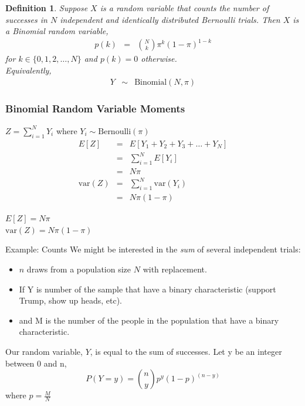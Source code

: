 \documentclass[handout]{beamer}
\newtheorem{defn}{Definition}
\numberwithin{equation}{section}
\begin{document}
\begin{frame}
\begin{defn}
Suppose $X$ is a random variable that counts the number of successes in $N$ independent and identically distributed Bernoulli trials.  Then $X$ is a \alert{Binomial} random variable, 
\begin{eqnarray}
p(k) & = & {{N}\choose{k}}\pi^{k} (1- \pi)^{1-k} \nonumber 
\end{eqnarray}
for $k \in \{0, 1, 2, \hdots, N\}$ and $p(k) = 0$ otherwise.  \\
Equivalently, 
\begin{eqnarray}
Y & \sim & \text{Binomial}(N, \pi) \nonumber 
\end{eqnarray}

\end{defn}

\end{frame}


\begin{frame}
\frametitle{Binomial Random Variable \alert{Moments}}
$Z = \sum_{i=1}^{N} Y_{i}$ where $Y_{i} \sim \text{Bernoulli}(\pi)$ \pause \\
\begin{eqnarray}
E[Z] & = & E[Y_{1} + Y_{2} + Y_{3} + \hdots + Y_{N} ] \nonumber \\
& = & \sum_{i=1}^{N} E[Y_{i} ] \nonumber \\
& = & N \pi \nonumber \\
\text{var}(Z) & = & \sum_{i=1}^{N} \text{var}(Y_{i}) \nonumber \\
& = & N \pi (1-\pi) \nonumber 
 \end{eqnarray}




$E[Z]  =   N \pi$ \\
$\text{var}(Z)  =  N \pi (1- \pi) \nonumber $

\pause \pause \pause \pause 


\end{frame}



\begin{frame}{Example: Counts}
We might be interested in the \emph{sum} of several independent trials:\pause
\begin{itemize}
\item $n$ draws from a population size $N$ with replacement.
\item If Y is number of the sample that have a binary characteristic (support Trump, show up heads, etc).
\item and M is the number of the people in the population that have a binary characteristic.
\end{itemize}
Our random variable, $Y$, is equal to the sum of successes.
\pause
Let y be an integer between 0 and n,
$$P(Y=y)={n\choose y} p^y(1-p)^{(n-y)}$$
where $p=\frac{M}{N}$

\end{frame}
\end{document}
